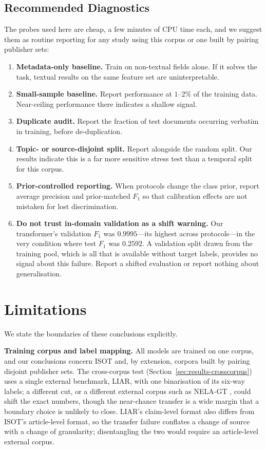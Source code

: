 \documentclass[conference]{IEEEtran}
\newcommand{\Fone}{$F_1$}
\begin{document}
\subsection{Recommended Diagnostics}
The probes used here are cheap, a few minutes of CPU time each, and we suggest
them as routine reporting for any study using this corpus or one built by
pairing publisher sets:
\begin{enumerate}
  \item \textbf{Metadata-only baseline.} Train on non-textual fields alone. If
    it solves the task, textual results on the same feature set are
    uninterpretable.
  \item \textbf{Small-sample baseline.} Report performance at $1$--$2\%$ of the
    training data. Near-ceiling performance there indicates a shallow signal.
  \item \textbf{Duplicate audit.} Report the fraction of test documents
    occurring verbatim in training, before de-duplication.
  \item \textbf{Topic- or source-disjoint split.} Report alongside the random
    split. Our results indicate this is a far more sensitive stress test than a
    temporal split for this corpus.
  \item \textbf{Prior-controlled reporting.} When protocols change the class
    prior, report average precision and prior-matched \Fone{} so that
    calibration effects are not mistaken for lost discrimination.
  \item \textbf{Do not trust in-domain validation as a shift warning.} Our
    transformer's validation \Fone{} was $0.9995$---its highest across
    protocols---in the very condition where test \Fone{} was $0.2592$. A
    validation split drawn from the training pool, which is all that is
    available without target labels, provides no signal about this failure.
    Report a shifted evaluation or report nothing about generalisation.
\end{enumerate}

\section{Limitations}
\label{sec:limitations}

We state the boundaries of these conclusions explicitly.

\textbf{Training corpus and label mapping.} All models are trained on one
corpus, and our conclusions concern ISOT and, by extension, corpora built by
pairing disjoint publisher sets. The cross-corpus test
(Section~\ref{sec:results-crosscorpus}) uses a single external benchmark, LIAR,
with one binarisation of its six-way labels; a different cut, or a different
external corpus such as NELA-GT \cite{norregaard2019nela}, could shift the exact
numbers, though the near-chance transfer is a wide margin that a boundary choice
is unlikely to close. LIAR's claim-level format also differs from ISOT's
article-level format, so the transfer failure conflates a change of source with
a change of granularity; disentangling the two would require an article-level
external corpus.
\end{document}
